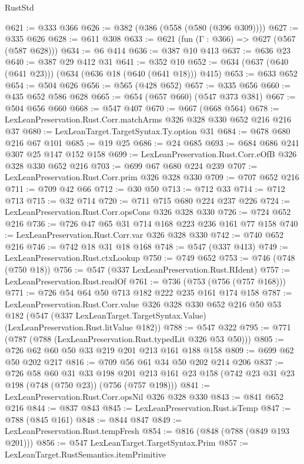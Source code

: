 \begin{lexlean}{RustStd}
\begin{coremodule}
@621 := @333 @366
@626 := @382 (@386 (@558 (@580 (@396 @309))))
@627 := @335 @626
@628 := @611 @308
@633 := @621 (fun (Γ : @366) => @627 (@567 (@587 @628)))
@634 := @6 @414
@636 := @387 @10 @413
@637 := @636 @23
@640 := @387 @29 @412 @31
@641 := @352 @10
@652 := @634 (@637 (@640 (@641 @23))) (@634 (@636 @18 (@640 (@641 @18))) @415)
@653 := @633 @652
@654 := @504 @626
@656 := @565 (@428 @652)
@657 := @335 @656
@660 := @435 @652 @586 @628
@665 := @654 (@657 @660) (@547 @373 @381)
@667 := @504 @656 @660
@668 := @547 @407
@670 := @667 (@668 @564)
@678 := LexLeanPreservation.Rust.Corr.matchArms @326 @328 @330 @652 @216 @216 @37
@680 := LexLeanTarget.TargetSyntax.Ty.option @31
@684 := @678 @680 @216 @67 @101
@685 := @19 @25
@686 := @24 @685
@693 := @684 @686 @241 @307 @25 @147 @152 @158
@699 := LexLeanPreservation.Rust.Corr.eOfB @326 @328 @330 @652 @216
@703 := @699 @67 @680 @224 @239
@707 := LexLeanPreservation.Rust.Corr.prim @326 @328 @330
@709 := @707 @652 @216
@711 := @709 @42 @66
@712 := @30 @50
@713 := @712 @33
@714 := @712 @713
@715 := @32 @714
@720 := @711 @715 @680 @224 @237 @226
@724 := LexLeanPreservation.Rust.Corr.opsCons @326 @328 @330
@726 := @724 @652 @216
@736 := @726 @47 @65 @31 @714 @168 @223 @236 @161 @77 @158
@740 := LexLeanPreservation.Rust.Corr.var @326 @328 @330
@742 := @740 @652 @216
@746 := @742 @18 @31 @18 @168
@748 := @547 (@337 @413)
@749 := LexLeanPreservation.Rust.ctxLookup
@750 := @749 @652
@753 := @746 (@748 (@750 @18))
@756 := @547 (@337 LexLeanPreservation.Rust.RIdent)
@757 := LexLeanPreservation.Rust.readOf
@761 := @736 (@753 (@756 (@757 @168)))
@771 := @726 @54 @64 @50 @713 @182 @222 @235 @161 @174 @158
@787 := LexLeanPreservation.Rust.Corr.value
    @326
    @328
    @330
    @652
    @216
    @50
    @53
    @182
    (@547 (@337 LexLeanTarget.TargetSyntax.Value) (LexLeanPreservation.Rust.litValue @182))
@788 := @547 @322
@795 := @771 (@787 (@788 (LexLeanPreservation.Rust.typedLit @326 @53 @50)))
@805 := @726 @62 @60 @50 @33 @219 @201 @213 @161 @188 @158
@809 := @699 @62 @50 @202 @217
@816 := @709 @56 @61 @34 @50 @202 @214 @206
@837 := @726
    @58
    @60
    @31
    @33
    @198
    @201
    @213
    @161
    @23
    @158
    (@742 @23 @31 @23 @198 (@748 (@750 @23)) (@756 (@757 @198)))
@841 := LexLeanPreservation.Rust.Corr.opsNil @326 @328 @330
@843 := @841 @652 @216
@844 := @837 @843
@845 := LexLeanPreservation.Rust.isTemp
@847 := @788 (@845 @161)
@848 := @844 @847
@849 := LexLeanPreservation.Rust.tempFresh
@854 := @816 (@848 (@788 (@849 @193 @201)))
@856 := @547 LexLeanTarget.TargetSyntax.Prim
@857 := LexLeanTarget.RustSemantics.itemPrimitive

\end{coremodule}
\end{lexlean}
